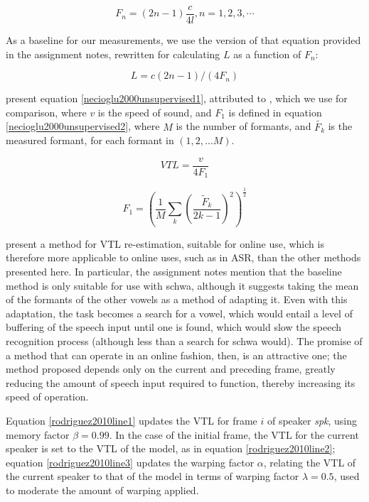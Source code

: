 \documentclass[11pt]{article}
\begin{document}
\begin{equation}
\label{johnson2003acoustic1}
F_n = (2n - 1)\frac{c}{4l}, n = 1, 2, 3, \cdots
\end{equation}

As a baseline for our measurements, we use the version of that equation provided in the assignment notes, rewritten for calculating $L$ as a function of $F_n$:

\begin{equation}
\label{johnson2003acoustic2}
L = c(2n - 1)/(4F_n)
\end{equation}

\citet{rodriguez2010line} present equation \ref{necioglu2000unsupervised1}, attributed to \citet{necioglu2000unsupervised}, which we use for comparison, where $v$ is the speed of sound, and $F_1$ is defined in equation \ref{necioglu2000unsupervised2}, where $M$ is the number of formants, and $\tilde{F_k}$ is the measured formant, for each formant in $(1, 2, \ldots M)$.

\begin{equation}
\label{necioglu2000unsupervised1}
VTL = \frac{v}{4F_1}
\end{equation}

\begin{equation}
\label{necioglu2000unsupervised2}
F_1 = \left( \frac{1}{M} \sum_{k}{\left( \frac{\tilde{F}_k}{2k - 1} \right)^2} \right)^{\frac{1}{2}}
\end{equation}

\citet{rodriguez2010line} present a method for VTL re-estimation, suitable for online use, which is therefore more applicable to online uses, such as in ASR, than the other methods presented here. In particular, the assignment notes mention that the baseline method is only suitable for use with schwa, although it suggests taking the mean of the formants of the other vowels as a method of adapting it. Even with this adaptation, the task becomes a search for a vowel, which would entail a level of buffering of the speech input until one is found, which would slow the speech recognition process (although less than a search for schwa would). The promise of a method that can operate in an online fashion, then, is an attractive one; the method proposed depends only on the current and preceding frame, greatly reducing the amount of speech input required to function, thereby increasing its speed of operation.

Equation \ref{rodriguez2010line1} updates the VTL for frame $i$ of speaker \textit{spk}, using memory factor $\beta = 0.99$. In the case of the initial frame, the VTL for the current speaker is set to the VTL of the model, as in equation \ref{rodriguez2010line2}; equation \ref{rodriguez2010line3} updates the warping factor $\alpha$, relating the VTL of the current speaker to that of the model in terms of warping factor $\lambda = 0.5$, used to moderate the amount of warping applied.
\end{document}
